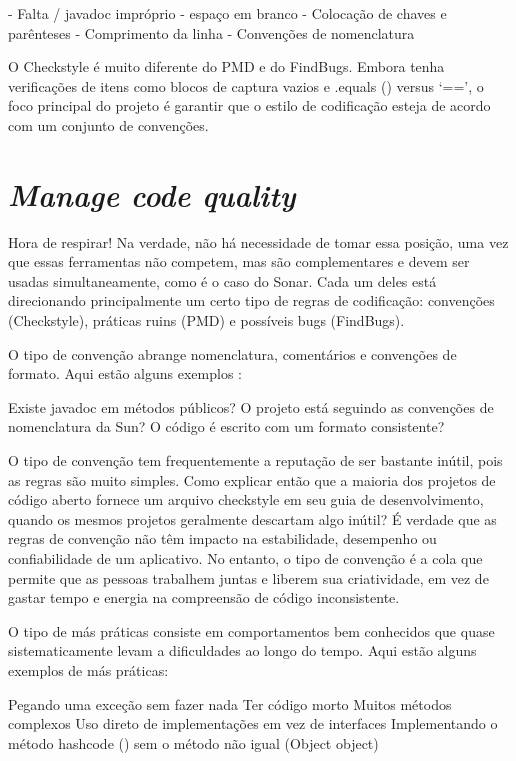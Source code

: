 \documentclass[12pt]{article}
\begin{document}
- Falta / javadoc impróprio
- espaço em branco
- Colocação de chaves e parênteses
- Comprimento da linha
- Convenções de nomenclatura

O Checkstyle é muito diferente do PMD e do FindBugs. Embora tenha verificações de itens como blocos de captura vazios e .equals () versus ‘==’, o foco principal do projeto é garantir que o estilo de codificação esteja de acordo com um conjunto de convenções.

\section{\textit{Manage code quality}} \label{sec:managecodequality}

Hora de respirar! Na verdade, não há necessidade de tomar essa posição, uma vez que essas ferramentas não competem, mas são complementares e devem ser usadas simultaneamente, como é o caso do Sonar. Cada um deles está direcionando principalmente um certo tipo de regras de codificação: convenções (Checkstyle), práticas ruins (PMD) e possíveis bugs (FindBugs).

O tipo de convenção abrange nomenclatura, comentários e convenções de formato. Aqui estão alguns exemplos :

    Existe javadoc em métodos públicos?
    O projeto está seguindo as convenções de nomenclatura da Sun?
    O código é escrito com um formato consistente?


O tipo de convenção tem frequentemente a reputação de ser bastante inútil, pois as regras são muito simples. Como explicar então que a maioria dos projetos de código aberto fornece um arquivo checkstyle em seu guia de desenvolvimento, quando os mesmos projetos geralmente descartam algo inútil? É verdade que as regras de convenção não têm impacto na estabilidade, desempenho ou confiabilidade de um aplicativo. No entanto, o tipo de convenção é a cola que permite que as pessoas trabalhem juntas e liberem sua criatividade, em vez de gastar tempo e energia na compreensão de código inconsistente.



O tipo de más práticas consiste em comportamentos bem conhecidos que quase sistematicamente levam a dificuldades ao longo do tempo. Aqui estão alguns exemplos de más práticas:

    Pegando uma exceção sem fazer nada
    Ter código morto
    Muitos métodos complexos
    Uso direto de implementações em vez de interfaces
    Implementando o método hashcode () sem o método não igual (Object object)
\end{document}
